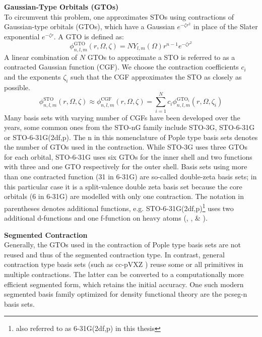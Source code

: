 \textbf{Gaussian-Type Orbitals (GTOs)}\\
To circumvent this problem, one approximates STOs using contractions of Gaussian-type orbitals (GTOs), which have a Gaussian $e^{-\zeta r^2}$ in place of the Slater exponential $e^{-\zeta r}$. A GTO is defined as: 
\begin{equation}
    \label{eq:gaussian_orbital}
    \phi_{n, l, m}^{\text{GTO}}(r, \Omega, \zeta) = N Y_{l,m}(\Omega) r^{n-1} e^{-\zeta r^2}
\end{equation}
A linear combination of $N$ GTOs to approximate a STO is referred to as a contracted Gaussian function (CGF). We choose the contraction coefficients $c_i$ and the exponents $\zeta_i$ such that the CGF approximates the STO as closely as possible. \\
\begin{equation}
    \phi_{n, l, m}^{\text{STO}}(r, \Omega, \zeta)  \approx \phi_{n, l, m}^{\text{CGF}}(r, \Omega, \zeta) = \sum_{i=1}^N c_i \phi_{n, l, m}^{\text{GTO}_i}(r, \Omega, \zeta_i)
\end{equation}
Many basis sets with varying number of CGFs have been developed over the years, some common ones from the STO-nG family include STO-3G, STO-6-31G or STO-6-31G(2df,p). The n in this nomenclature of Pople type basis sets \parencite{ref:pople_basis} denotes the number of GTOs used in the contraction. While STO-3G uses three GTOs for each orbital, STO-6-31G uses six GTOs for the inner shell and two functions with three and one GTO respectively for the outer shell. Basis sets using more than one contracted function (31 in 6-31G) are so-called double-zeta basis sets; in this particular case it is a split-valence double zeta basis set because the core orbitals (6 in 6-31G) are modelled with only one contraction. The notation in parentheses denotes additional functions, e.g. STO-6-31G(2df,p)\footnote{also referred to as 6-31G(2df,p) in this thesis} uses two additional d-functions and one f-function on heavy atoms (, ,  \& ). 

\textbf{Segmented Contraction}\\
Generally, the GTOs used in the contraction of Pople type basis sets are not reused and thus of the segmented contraction type. In contrast, general contraction type basis sets (such as cc-pVXZ \parencite{ref:cc-pVXZ}) reuse some or all primitives in multiple contractions. The latter can be converted to a computationally more efficient segmented form, which retains the initial accuracy. One such modern segmented basis family optimized for density functional theory are the pcseg-n basis sets. \parencite{ref:Jensen2014pcs}

